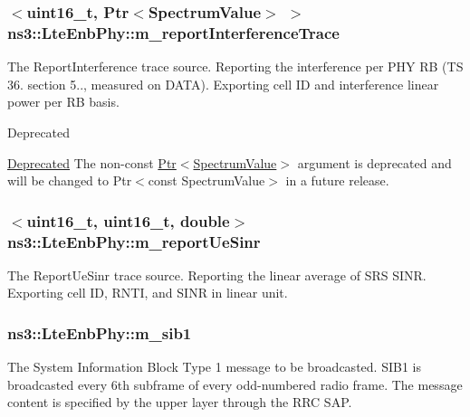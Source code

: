 \subsubsection[{\texorpdfstring{m\+\_\+report\+Interference\+Trace}{m_reportInterferenceTrace}}]{$<$uint16\+\_\+t, {\bf Ptr}$<${\bf Spectrum\+Value}$>$ $>$ ns3\+::\+Lte\+Enb\+Phy\+::m\+\_\+report\+Interference\+Trace\hspace{0.3cm}{\ttfamily [private]}}\hypertarget{classns3_1_1LteEnbPhy_ab0680f139d0eb336e9d1d3dffcee80a1}{}\label{classns3_1_1LteEnbPhy_ab0680f139d0eb336e9d1d3dffcee80a1}
The {\ttfamily Report\+Interference} trace source. Reporting the interference per P\+HY RB (TS 36. section 5.., measured on D\+A\+TA). Exporting cell ID and interference linear power per RB basis. \begin{DoxyRefDesc}{Deprecated}
\item[\hyperlink{deprecated__deprecated000021}{Deprecated}]The non-\/const {\ttfamily \hyperlink{classns3_1_1Ptr}{Ptr$<$\+Spectrum\+Value$>$}} argument is deprecated and will be changed to {\ttfamily Ptr$<$const Spectrum\+Value$>$} in a future release. \end{DoxyRefDesc}
\subsubsection[{\texorpdfstring{m\+\_\+report\+Ue\+Sinr}{m_reportUeSinr}}]{$<$uint16\+\_\+t, uint16\+\_\+t, double$>$ ns3\+::\+Lte\+Enb\+Phy\+::m\+\_\+report\+Ue\+Sinr\hspace{0.3cm}{\ttfamily [private]}}\hypertarget{classns3_1_1LteEnbPhy_a97d34e9ba36db6eb607a40c239dd408e}{}\label{classns3_1_1LteEnbPhy_a97d34e9ba36db6eb607a40c239dd408e}
The {\ttfamily Report\+Ue\+Sinr} trace source. Reporting the linear average of S\+RS S\+I\+NR. Exporting cell ID, R\+N\+TI, and S\+I\+NR in linear unit. 
\subsubsection[{\texorpdfstring{m\+\_\+sib1}{m_sib1}}]{ ns3\+::\+Lte\+Enb\+Phy\+::m\+\_\+sib1\hspace{0.3cm}{\ttfamily [private]}}\hypertarget{classns3_1_1LteEnbPhy_ac5495a4ef3c8576b2f0a2c2cffdcf2aa}{}\label{classns3_1_1LteEnbPhy_ac5495a4ef3c8576b2f0a2c2cffdcf2aa}
The System Information Block Type 1 message to be broadcasted. S\+I\+B1 is broadcasted every 6th subframe of every odd-\/numbered radio frame. The message content is specified by the upper layer through the R\+RC S\+AP. 
